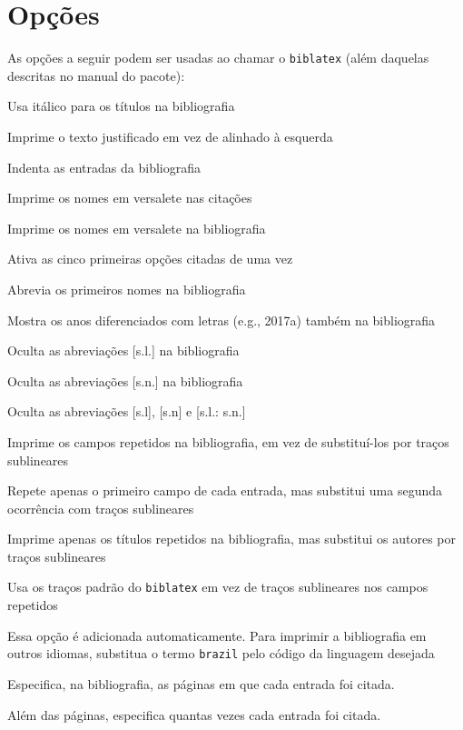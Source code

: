 \documentclass[a4paper]{article}
\begin{document}
\clearpage
\section{Opções}%
\label{sec:opções}

As opções a seguir podem ser usadas ao chamar o \texttt{biblatex} (além daquelas descritas no manual do pacote):

\begin{description}[itemindent=-1em,leftmargin=3em]%
  \item [ittitles] Usa itálico para os títulos na bibliografia
  \item [justify] Imprime o texto justificado em vez de alinhado à esquerda
  \item [indent] Indenta as entradas da bibliografia
  \item [sccite] Imprime os nomes em versalete nas citações
  \item [scbib] Imprime os nomes em versalete na bibliografia
  \item [pretty] Ativa as cinco primeiras opções citadas de uma vez
  \item [giveninits] Abrevia os primeiros nomes na bibliografia
  \item [extrayear] Mostra os anos diferenciados com letras (e.g., 2017a) também na bibliografia
  \item [nosl] Oculta as abreviações [s.l.] na bibliografia
  \item [nosn] Oculta as abreviações [s.n.] na bibliografia
  \item [noslsn] Oculta as abreviações [s.l], [s.n] e [s.l.: s.n.]
  \item [repeatfields] Imprime os campos repetidos na bibliografia, em vez de
    subs\-ti\-tu\-í-los por traços sublineares
  \item [repeatfirstfields] Repete apenas o primeiro campo de cada entrada,
    mas substitui uma segunda ocorrência com traços sublineares
  \item [repeattitles] Imprime apenas os títulos repetidos na bibliografia,
    mas substitui os autores por traços sublineares
  \item [usedashes] Usa os traços padrão do \texttt{biblatex} em vez de
    traços sublineares nos campos repetidos
  \item [language=brazil] Essa opção é adicionada automaticamente. Para
    imprimir a bibliografia em outros idiomas, substitua o termo
    \texttt{brazil} pelo código da linguagem desejada
  \item [backref] Especifica, na bibliografia, as páginas em que cada entrada
    foi citada.
  \item [citecount] Além das páginas, especifica quantas vezes cada entrada
    foi citada.
\end{description}%
\end{document}

